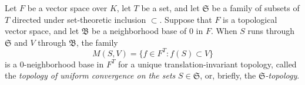Let \(F\) be a vector space over \(K\), let \(T\) be a set, and let \(\mathfrak{S}\) be a family of subsets of \(T\) directed under set-theoretic inclusion \(\subset\). Suppose that \(F\) is a topological vector space, and let \(\mathfrak{B}\) be a neighborhood base of \(0\) in \(F\). When \(S\) runs through \(\mathfrak{S}\) and \(V\) through \(\mathfrak{B}\), the family
\[
M(S, V) = \{ f \in F^T : f(S) \subset V \}
\]
is a \(0\)-neighborhood base in \(F^T\) for a unique translation-invariant topology, called the \textit{topology of uniform convergence on the sets} \(S \in \mathfrak{S}\), or, briefly, the \textit{\(\mathfrak{S}\)-topology}.
